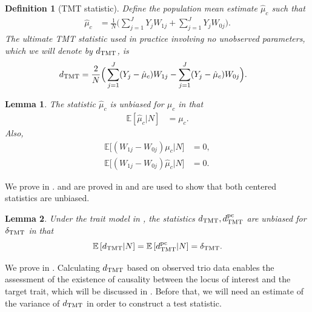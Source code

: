 \documentclass[12pt]{extarticle}
\newtheorem{lem}{Lemma}%
\newtheorem{defin}{Definition}%
\newcommand{\E}{\mathbb{E}}
\newcommand{\nind}{J}
\newcommand{\tmt}{{\normalfont \text{TMT}}}
\newcommand{\dtmtpc}{d_{\tmt}^{\normalfont \text{pc}}}
\begin{document}
\begin{defin}[TMT statistic]\label{def:dtmt}
Define the population mean estimate $\hat{\mu}_c$ such that
\begin{align*}
\hat{\mu}_c &= \frac{1}{N}\Big(\sum_{j=1}^{\nind}Y_jW_{1j}+\sum_{j=1}^{\nind}Y_jW_{0j}\Big).
\end{align*}
The ultimate TMT statistic used in practice involving no unobserved parameters, which we will denote by $d_{\tmt}$, is 
\begin{align} \label{eq:dtmt}
d_{\tmt} &= \frac{2}{N}\Big(\sum_{j=1}^{\nind}(Y_j-\hat{\mu}_c)W_{1j} - \sum_{j=1}^{\nind}(Y_j-\hat{\mu}_c)W_{0j}\Big).
\end{align}
\end{defin}

\begin{lem} \label{lem:muc}
The statistic $\hat{\mu}_c$ is unbiased for $\mu_c$ in that 
\begin{align}
\E[\hat{\mu}_c|N] & = \mu_c. \label{eq:muc_a}
\end{align} 
Also, 
\begin{align}
\E\Big[(W_{1j}-W_{0j})\mu_c\Big|N\Big] & = 0, \label{eq:muc_b} \\
\E\Big[(W_{1j}-W_{0j})\hat{\mu}_c\Big|N\Big] & = 0. \label{eq:muc_c}
\end{align}
\end{lem}

\noindent We prove  in .  and  are proved in  and are used to show that both centered statistics are unbiased.

\begin{lem} \label{lem:unbiased_dtmt_estimand}
Under the trait model in , the statistics $d_{\tmt}, \dtmtpc$ are unbiased for $\delta_{\tmt}$ in that 
\begin{equation*}
\E \left[ d_{\tmt} | N \right] = \E \left[ \dtmtpc | N \right] = \delta_{\tmt}.
\end{equation*}
\end{lem}

\noindent We prove  in . Calculating $d_{\tmt}$ based on observed trio data enables the assessment of the existence of causality between the locus of interest and the target trait, which will be discussed in . Before that, we will need an estimate of the variance of $d_{\tmt}$ in order to construct a test statistic.
\end{document}
